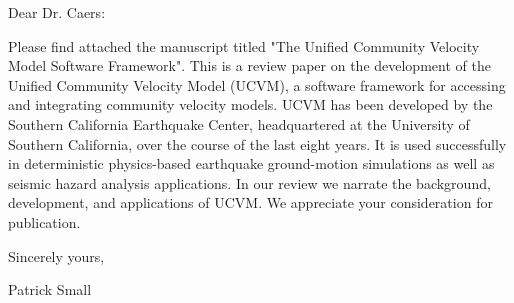 \documentclass{letter}
\begin{document}

\begin{letter}{}
\opening{Dear Dr. Caers:}

Please find attached the manuscript titled "The Unified Community Velocity Model Software Framework". This is a review paper on the development of the Unified Community Velocity Model (UCVM), a software framework for accessing and integrating community velocity models. UCVM has been developed by the Southern California Earthquake Center, headquartered at the University of Southern California, over the course of the last eight years. It is used successfully in deterministic physics-based earthquake ground-motion simulations as well as seismic hazard analysis applications. In our review we narrate the background, development, and applications of UCVM. We appreciate your consideration for publication.
\vspace{3mm}

Sincerely yours,

Patrick Small


\end{letter}
\end{document}
